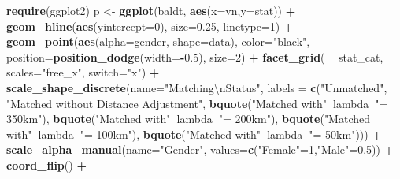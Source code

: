 \documentclass[
]{article}
\newenvironment{Shaded}{\begin{snugshade}}{\end{snugshade}}
\newcommand{\CharTok}[1]{\textcolor[rgb]{0.31,0.60,0.02}{#1}}
\newcommand{\DataTypeTok}[1]{\textcolor[rgb]{0.13,0.29,0.53}{#1}}
\newcommand{\DecValTok}[1]{\textcolor[rgb]{0.00,0.00,0.81}{#1}}
\newcommand{\FloatTok}[1]{\textcolor[rgb]{0.00,0.00,0.81}{#1}}
\newcommand{\KeywordTok}[1]{\textcolor[rgb]{0.13,0.29,0.53}{\textbf{#1}}}
\newcommand{\NormalTok}[1]{#1}
\newcommand{\OperatorTok}[1]{\textcolor[rgb]{0.81,0.36,0.00}{\textbf{#1}}}
\newcommand{\StringTok}[1]{\textcolor[rgb]{0.31,0.60,0.02}{#1}}
\begin{document}
\begin{Shaded}
\begin{Highlighting}[]
\KeywordTok{require}\NormalTok{(ggplot2)}
\NormalTok{p <-}\StringTok{ }\KeywordTok{ggplot}\NormalTok{(baldt, }\KeywordTok{aes}\NormalTok{(}\DataTypeTok{x=}\NormalTok{vn,}\DataTypeTok{y=}\NormalTok{stat)) }\OperatorTok{+}\StringTok{ }
\StringTok{  }\KeywordTok{geom_hline}\NormalTok{(}\KeywordTok{aes}\NormalTok{(}\DataTypeTok{yintercept=}\DecValTok{0}\NormalTok{), }\DataTypeTok{size=}\FloatTok{0.25}\NormalTok{, }\DataTypeTok{linetype=}\DecValTok{1}\NormalTok{) }\OperatorTok{+}\StringTok{ }
\StringTok{  }\KeywordTok{geom_point}\NormalTok{(}\KeywordTok{aes}\NormalTok{(}\DataTypeTok{alpha=}\NormalTok{gender, }\DataTypeTok{shape=}\NormalTok{data), }\DataTypeTok{color=}\StringTok{"black"}\NormalTok{,}
             \DataTypeTok{position=}\KeywordTok{position_dodge}\NormalTok{(}\DataTypeTok{width=}\OperatorTok{-}\FloatTok{0.5}\NormalTok{), }\DataTypeTok{size=}\DecValTok{2}\NormalTok{) }\OperatorTok{+}\StringTok{ }
\StringTok{  }\KeywordTok{facet_grid}\NormalTok{( }\OperatorTok{~}\StringTok{ }\NormalTok{stat_cat, }\DataTypeTok{scales=}\StringTok{"free_x"}\NormalTok{, }\DataTypeTok{switch=}\StringTok{"x"}\NormalTok{) }\OperatorTok{+}\StringTok{ }
\StringTok{  }\KeywordTok{scale_shape_discrete}\NormalTok{(}\DataTypeTok{name=}\StringTok{"Matching}\CharTok{\textbackslash{}n}\StringTok{Status"}\NormalTok{, }
                       \DataTypeTok{labels =} \KeywordTok{c}\NormalTok{(}\StringTok{"Unmatched"}\NormalTok{,}
                                  \StringTok{"Matched without Distance Adjustment"}\NormalTok{,}
                                  \KeywordTok{bquote}\NormalTok{(}\StringTok{"Matched with"}\OperatorTok{~}\NormalTok{lambda}\OperatorTok{~}\StringTok{"= 350km"}\NormalTok{),}
                                  \KeywordTok{bquote}\NormalTok{(}\StringTok{"Matched with"}\OperatorTok{~}\NormalTok{lambda}\OperatorTok{~}\StringTok{"= 200km"}\NormalTok{),}
                                  \KeywordTok{bquote}\NormalTok{(}\StringTok{"Matched with"}\OperatorTok{~}\NormalTok{lambda}\OperatorTok{~}\StringTok{"= 100km"}\NormalTok{),}
                                  \KeywordTok{bquote}\NormalTok{(}\StringTok{"Matched with"}\OperatorTok{~}\NormalTok{lambda}\OperatorTok{~}\StringTok{"= 50km"}\NormalTok{))) }\OperatorTok{+}\StringTok{ }
\StringTok{  }\KeywordTok{scale_alpha_manual}\NormalTok{(}\DataTypeTok{name=}\StringTok{"Gender"}\NormalTok{, }\DataTypeTok{values=}\KeywordTok{c}\NormalTok{(}\StringTok{"Female"}\NormalTok{=}\DecValTok{1}\NormalTok{,}\StringTok{"Male"}\NormalTok{=}\FloatTok{0.5}\NormalTok{)) }\OperatorTok{+}\StringTok{ }
\StringTok{  }\KeywordTok{coord_flip}\NormalTok{() }\OperatorTok{+}

\end{Highlighting}
\end{Shaded}
\end{document}
